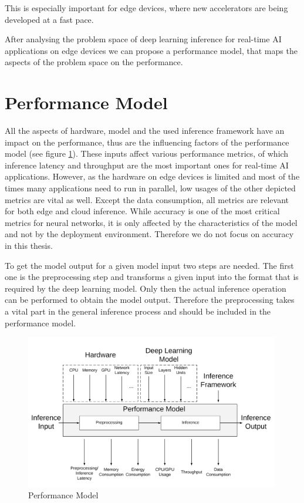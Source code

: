 
This is especially important for edge devices, where new accelerators are being developed at a fast pace.


After analysing the problem space of deep learning inference for real-time AI applications on edge devices we can propose a performance model, that maps the aspects of the problem space on the performance.



\section{Performance Model}
All the aspects of hardware, model and the used inference framework have an impact on the performance, thus are the influencing factors of the performance model (see figure \ref{fig:perfmodel}). These inputs affect various performance metrics, of which inference latency and throughput are the most important ones for real-time AI applications. However, as the hardware on edge devices is limited and most of the times many applications need to run in parallel, low usages of the other depicted metrics are vital as well.
Except the data consumption, all metrics are relevant for both edge and cloud inference.
While accuracy is one of the most critical metrics for neural networks, it is only affected by the characteristics of the model and not by the deployment environment. Therefore we do not focus on accuracy in this thesis.

To get the model output for a given model input two steps are needed. The first one is the preprocessing step and transforms a given input into the format that is required by the deep learning model. Only then the actual inference operation can be performed to obtain the model output. Therefore the preprocessing takes a vital part in the general inference process and should be included in the performance model.
\begin{figure}[H]
\centering
\includegraphics[width=0.99\textwidth]{./Bilder/trade_offs.png}
\caption{Performance Model}
\label{fig:perfmodel}
\end{figure}
